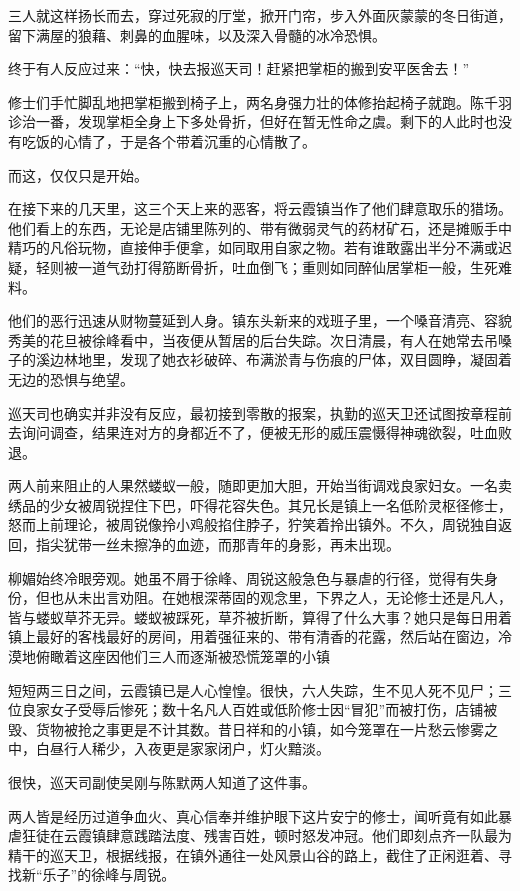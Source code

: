 三人就这样扬长而去，穿过死寂的厅堂，掀开门帘，步入外面灰蒙蒙的冬日街道，留下满屋的狼藉、刺鼻的血腥味，以及深入骨髓的冰冷恐惧。

终于有人反应过来：“快，快去报巡天司！赶紧把掌柜的搬到安平医舍去！”

修士们手忙脚乱地把掌柜搬到椅子上，两名身强力壮的体修抬起椅子就跑。陈千羽诊治一番，发现掌柜全身上下多处骨折，但好在暂无性命之虞。剩下的人此时也没有吃饭的心情了，于是各个带着沉重的心情散了。

\vspace{2em}

而这，仅仅只是开始。

在接下来的几天里，这三个天上来的恶客，将云霞镇当作了他们肆意取乐的猎场。他们看上的东西，无论是店铺里陈列的、带有微弱灵气的药材矿石，还是摊贩手中精巧的凡俗玩物，直接伸手便拿，如同取用自家之物。若有谁敢露出半分不满或迟疑，轻则被一道气劲打得筋断骨折，吐血倒飞；重则如同醉仙居掌柜一般，生死难料。

他们的恶行迅速从财物蔓延到人身。镇东头新来的戏班子里，一个嗓音清亮、容貌秀美的花旦被徐峰看中，当夜便从暂居的后台失踪。次日清晨，有人在她常去吊嗓子的溪边林地里，发现了她衣衫破碎、布满淤青与伤痕的尸体，双目圆睁，凝固着无边的恐惧与绝望。

巡天司也确实并非没有反应，最初接到零散的报案，执勤的巡天卫还试图按章程前去询问调查，结果连对方的身都近不了，便被无形的威压震慑得神魂欲裂，吐血败退。

两人前来阻止的人果然蝼蚁一般，随即更加大胆，开始当街调戏良家妇女。一名卖绣品的少女被周锐捏住下巴，吓得花容失色。其兄长是镇上一名低阶灵枢径修士，怒而上前理论，被周锐像拎小鸡般掐住脖子，狞笑着拎出镇外。不久，周锐独自返回，指尖犹带一丝未擦净的血迹，而那青年的身影，再未出现。

柳媚始终冷眼旁观。她虽不屑于徐峰、周锐这般急色与暴虐的行径，觉得有失身份，但也从未出言劝阻。在她根深蒂固的观念里，下界之人，无论修士还是凡人，皆与蝼蚁草芥无异。蝼蚁被踩死，草芥被折断，算得了什么大事？她只是每日用着镇上最好的客栈最好的房间，用着强征来的、带有清香的花露，然后站在窗边，冷漠地俯瞰着这座因他们三人而逐渐被恐慌笼罩的小镇

短短两三日之间，云霞镇已是人心惶惶。很快，六人失踪，生不见人死不见尸；三位良家女子受辱后惨死；数十名凡人百姓或低阶修士因“冒犯”而被打伤，店铺被毁、货物被抢之事更是不计其数。昔日祥和的小镇，如今笼罩在一片愁云惨雾之中，白昼行人稀少，入夜更是家家闭户，灯火黯淡。

很快，巡天司副使吴刚与陈默两人知道了这件事。

两人皆是经历过道争血火、真心信奉并维护眼下这片安宁的修士，闻听竟有如此暴虐狂徒在云霞镇肆意践踏法度、残害百姓，顿时怒发冲冠。他们即刻点齐一队最为精干的巡天卫，根据线报，在镇外通往一处风景山谷的路上，截住了正闲逛着、寻找新“乐子”的徐峰与周锐。

